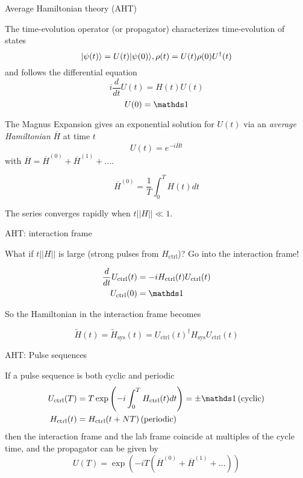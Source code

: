 \documentclass{beamer}
\begin{document}
\begin{frame}{Average Hamiltonian theory (AHT)}

The time-evolution operator (or propagator) characterizes time-evolution of states
\[
|\psi(t)\rangle = U(t)|\psi(0)\rangle, \rho(t) = U(t) \rho(0) U^\dagger(t)
\]
and follows the differential equation
\[
i \frac{d}{dt} U(t) = H(t)U(t)
\]
\[
U(0) = \identity
\]

The Magnus Expansion gives an exponential solution for $U(t)$
via an \emph{average Hamiltonian} $\overline{H}$ at time $t$ \cite{Blanes_2009,2010EJPh...31..907B}
\[
U(t) = e^{-i \overline{H} t}
\]
with $\overline{H} = \overline{H}^{(0)} + \overline{H}^{(1)} + \dots$.

\[
\overline{H}^{(0)} = \frac{1}{T} \int_0^{T}
    H(t) dt
\]

The series converges rapidly when $t||H|| \ll 1$.

\end{frame}

\begin{frame}{AHT: interaction frame}

What if $t||H||$ is large (strong pulses from $H_{\text{ctrl}}$)? Go into the interaction frame! \cite{brinkmann_2016}

\begin{align*}
    \frac{d}{dt} U_{\text{ctrl}}(t) &=
        -i H_{\text{ctrl}}(t)U_{\text{ctrl}}(t) \\
    U_{\text{ctrl}}(0) &= \identity
\end{align*}

So the Hamiltonian in the interaction frame becomes

\[
    \widetilde{H}(t) = \widetilde{H}_{\text{sys}}(t) = U_{\text{ctrl}}(t)^\dagger H_{\text{sys}} U_{\text{ctrl}}(t)
\]

\end{frame}

\begin{frame}{AHT: Pulse sequences}

If a pulse sequence is both cyclic and periodic \cite{gerstein-dybowski}
\begin{align*}
    U_{\text{ctrl}}(T) &= T\exp \left(
        -i \int_0^{T} H_{\text{ctrl}}(t) dt \right) = \pm \identity
         \, \text{(cyclic)} \\
    H_{\text{ctrl}}(t) &= H_{\text{ctrl}}(t + NT) \, \text{(periodic)}
\end{align*}
then the interaction frame and the lab frame coincide at multiples of
the cycle time, and the propagator can be given by
\[
    U(T) = \exp\left( -i T (\overline{H}^{(0)} +
        \overline{H}^{(1)} + \dots) \right)
\]

\end{frame}
\end{document}
